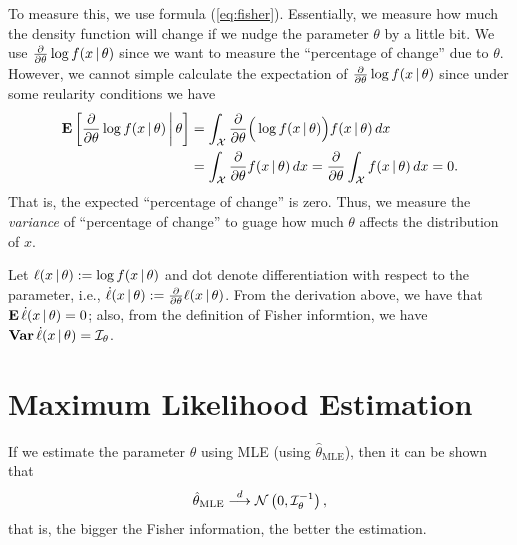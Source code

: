 \documentclass[a4paper,11pt]{article}
\begin{document}
To measure this, we use formula (\ref{eq:fisher}).
Essentially, we measure how much the density function will change if we nudge
the parameter $\theta$ by a little bit.
We use $\frac{\partial}{\partial\theta}\log f(x\given\theta)$ since we want 
to measure the ``percentage of change'' due to $\theta$.
However, we cannot simple calculate the expectation of $\frac{\partial}{\partial\theta}\log f(x\given\theta)$ since under some reularity conditions we have
\begin{align*}
	\E\left[\frac{\partial}{\partial\theta}\log f(x\given\theta)\given[\middle]\theta\right]
	&= \int_{\mathcal{X}} \frac{\partial}{\partial\theta}\Big(\log f(x\given\theta)\Big) f(x\given\theta) \dd{x} \\
	&= \int_{\mathcal{X}} \frac{\partial}{\partial\theta}f(x\given\theta) \dd{x}
	= \frac{\partial}{\partial\theta} \int_{\mathcal{X}} f(x\given\theta) \dd{x}
	= 0.
\end{align*}
That is, the expected ``percentage of change'' is zero.
Thus, we measure the \emph{variance} of ``percentage of change'' to guage how much $\theta$ affects the distribution of $x$.

Let $\ell(x\given\theta):=\log f(x\given\theta)$ and dot denote differentiation with respect to the parameter, i.e.,
$\dot\ell(x\given\theta):=\frac{\partial}{\partial\theta}\ell(x\given\theta)$.
From the derivation above, we have that $\E{\dot\ell(x\given\theta)}=0$;
also, from the definition of Fisher informtion,
we have $\var{\dot\ell(x\given\theta)}=\mathcal{I}_{\theta}$.

\section{Maximum Likelihood Estimation}

If we estimate the parameter $\theta$ using MLE (using $\hat{\theta}_{\text{MLE}}$),
then it can be shown that
\begin{align}\label{eq:mle}
	\hat{\theta}_{\text{MLE}}
	\dto
	\normal{0,\mathcal{I}_{\theta}\inv},
\end{align}
that is, the bigger the Fisher information, the better the estimation.
\end{document}
